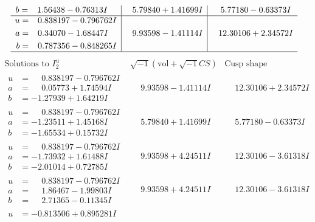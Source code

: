 \documentclass[1p]{elsarticle_modified}
\theoremstyle{definition}
\newcommand{\I}{\sqrt{-1}}
\begin{document}
$$\begin{array}{c|c|c}
\begin{aligned}
b &= \phantom{-}1.56438 - 0.76313 I\end{aligned}
 & \phantom{-}5.79840 + 1.41699 I & \phantom{-}5.77180 - 0.63373 I \\ \hline\begin{aligned}
u &= \phantom{-}0.838197 - 0.796762 I \\
a &= \phantom{-}0.34070 - 1.68447 I \\
b &= \phantom{-}0.787356 - 0.848265 I\end{aligned}
 & \phantom{-}9.93598 - 1.41114 I & \phantom{-}12.30106 + 2.34572 I\\
 \hline 
 \end{array}$$\newpage$$\begin{array}{c|c|c}  
\text{Solutions to }I^u_{2}& \I (\text{vol} + \sqrt{-1}CS) & \text{Cusp shape}\\
 \hline 
\begin{aligned}
u &= \phantom{-}0.838197 - 0.796762 I \\
a &= \phantom{-}0.05773 + 1.74594 I \\
b &= -1.27939 + 1.64219 I\end{aligned}
 & \phantom{-}9.93598 - 1.41114 I & \phantom{-}12.30106 + 2.34572 I \\ \hline\begin{aligned}
u &= \phantom{-}0.838197 - 0.796762 I \\
a &= -1.23511 + 1.45168 I \\
b &= -1.65534 + 0.15732 I\end{aligned}
 & \phantom{-}5.79840 + 1.41699 I & \phantom{-}5.77180 - 0.63373 I \\ \hline\begin{aligned}
u &= \phantom{-}0.838197 - 0.796762 I \\
a &= -1.73932 + 1.61488 I \\
b &= -2.01014 + 0.72785 I\end{aligned}
 & \phantom{-}9.93598 + 4.24511 I & \phantom{-}12.30106 - 3.61318 I \\ \hline\begin{aligned}
u &= \phantom{-}0.838197 - 0.796762 I \\
a &= \phantom{-}1.86467 - 1.99803 I \\
b &= \phantom{-}2.71365 - 0.11345 I\end{aligned}
 & \phantom{-}9.93598 + 4.24511 I & \phantom{-}12.30106 - 3.61318 I \\ \hline\begin{aligned}
u &= -0.813506 + 0.895281 I \\

\end{aligned}
\end{array}$$
\end{document}
